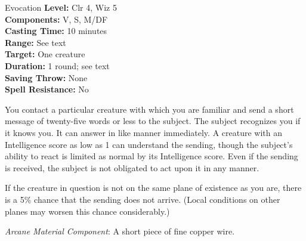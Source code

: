 {Evocation}
{
	\textbf{Level:}
	Clr 4, Wiz 5\\
	\textbf{Components:}
	V, S, M/DF\\
	\textbf{Casting Time:}
	10 minutes\\
	\textbf{Range:}
	See text\\
	\textbf{Target:}
	One creature\\
	\textbf{Duration:}
	1 round; see text\\
	\textbf{Saving Throw:}
	None\\
	\textbf{Spell Resistance:}
	No\\
}
{
	You contact a particular creature with which you are familiar and send a short message of twenty-five words or less to the subject. The subject recognizes you if it knows you. It can answer in like manner immediately. A creature with an Intelligence score as low as 1 can understand the sending, though the subject's ability to react is limited as normal by its Intelligence score. Even if the sending is received, the subject is not obligated to act upon it in any manner.

	If the creature in question is not on the same plane of existence as you are, there is a 5\% chance that the sending does not arrive. (Local conditions on other planes may worsen this chance considerably.)

	\textit{Arcane Material Component}:
	A short piece of fine copper wire.

}
